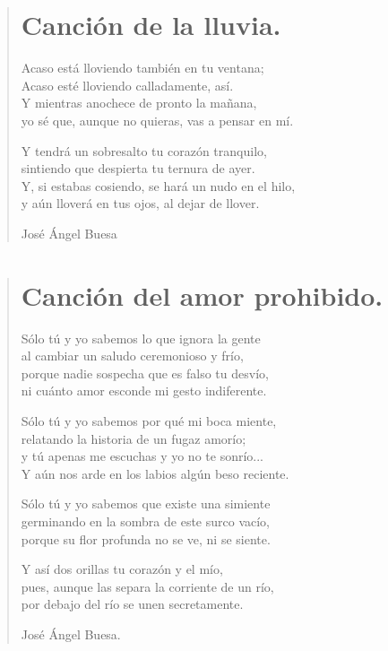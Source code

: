 \documentclass[11pt, portrait, twoside, notitlepage, openright]{book}
\begin{document}
\newpage
\begin{verse}
\begin{center}
\section{Canción de la lluvia.}
\end{center}
Acaso está lloviendo también en tu ventana;\\
Acaso esté lloviendo calladamente, así.\\
Y mientras anochece de pronto la mañana,\\
yo sé que, aunque no quieras, vas a pensar en mí.
\newline

Y tendrá un sobresalto tu corazón tranquilo,\\
sintiendo que despierta tu ternura de ayer.\\
Y, si estabas cosiendo, se hará un nudo en el hilo,\\
y aún lloverá en tus ojos, al dejar de llover.
\newline

José Ángel Buesa
\end{verse}

\newpage
\begin{verse}
\begin{center}
\section{Canción del amor prohibido.}
\end{center}
Sólo tú y yo sabemos lo que ignora la gente\\
al cambiar un saludo ceremonioso y frío,\\
porque nadie sospecha que es falso tu desvío,\\
ni cuánto amor esconde mi gesto indiferente.
\newline

Sólo tú y yo sabemos por qué mi boca miente,\\
relatando la historia de un fugaz amorío;\\
y tú apenas me escuchas y yo no te sonrío...\\
Y aún nos arde en los labios algún beso reciente.
\newline

Sólo tú y yo sabemos que existe una simiente\\
germinando en la sombra de este surco vacío,\\
porque su flor profunda no se ve, ni se siente.
\newline

Y así dos orillas tu corazón y el mío,\\
pues, aunque las separa la corriente de un río,\\
por debajo del río se unen secretamente.
\newline

José Ángel Buesa.
\end{verse}
\end{document}
